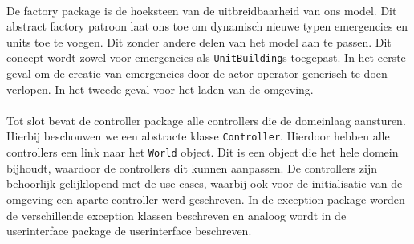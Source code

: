 \paragraph{}
De factory package is de hoeksteen van de uitbreidbaarheid van ons model. Dit abstract factory patroon laat ons toe om dynamisch nieuwe typen emergencies en units toe te voegen. Dit zonder andere delen van het model aan te passen. Dit concept wordt zowel voor emergencies als \verb+UnitBuilding+s toegepast. In het eerste geval om de creatie van emergencies door de actor operator generisch te doen verlopen. In het tweede geval voor het laden van de omgeving.
\paragraph{}
Tot slot bevat de controller package alle controllers die de domeinlaag aansturen. Hierbij beschouwen we een abstracte klasse \verb+Controller+. Hierdoor hebben alle controllers een link naar het \verb+World+ object. Dit is een object die het hele domein bijhoudt, waardoor de controllers dit kunnen aanpassen. De controllers zijn behoorlijk gelijklopend met de use cases, waarbij ook voor de initialisatie van de omgeving een aparte controller werd geschreven. In de exception package worden de verschillende exception klassen beschreven en analoog wordt in de userinterface package de userinterface beschreven.

